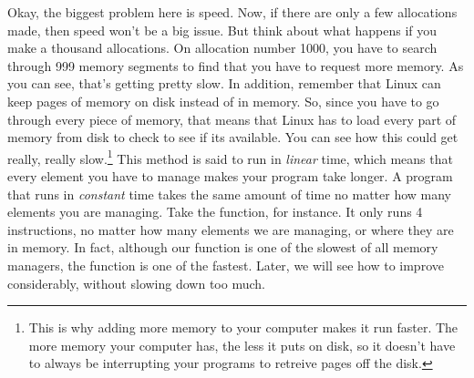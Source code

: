 Okay, the biggest problem here is speed.  Now, if there are only a few allocations made,
then speed won't be a big issue.  But think about what happens if you make a thousand
allocations.  On allocation number 1000, you have to search through 999 memory segments
to find that you have to request more memory.  As you can see, that's getting pretty
slow.  In addition, remember that Linux can keep pages of memory on disk instead of in
memory.  So, since you have to go through every piece of memory, that means that Linux
has to load every part of memory from disk to check to see if its available.  You can
see how this could get really, really slow.\footnote{This is why adding more
memory to your computer makes it run faster.  The more memory your computer has, the
less it puts on disk, so it doesn't have to always be interrupting your programs to
retreive pages off the disk.}  This method is said to run in 
\emph{linear} time, which means that every element you have to
manage makes your program take longer.   A program that runs in \emph{constant}
time takes the same amount of time no matter how many elements you are managing.
Take the  function, for instance.  It only runs 4 instructions,
no matter how many elements we are managing, or where they are in memory.  In fact, although
our  function is one of the slowest of all memory managers,
the  function is one of the fastest.  Later, we will see
how to improve  considerably, without slowing down
 too much.

